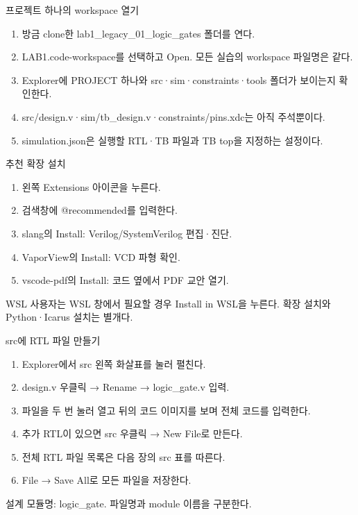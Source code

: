 \begin{frame}{프로젝트 하나의 workspace 열기}\relax
\small
\begin{enumerate}\setlength{\itemsep}{0.22cm}
\item 방금 clone한 lab1\_legacy\_01\_logic\_gates 폴더를 연다.
\item LAB1.code-workspace를 선택하고 Open. 모든 실습의 workspace 파일명은 같다.
\item Explorer에 PROJECT 하나와 src·sim·constraints·tools 폴더가 보이는지 확인한다.
\item src/design.v·sim/tb\_design.v·constraints/pins.xdc는 아직 주석뿐이다.
\item simulation.json은 실행할 RTL·TB 파일과 TB top을 지정하는 설정이다.
\end{enumerate}

\end{frame}

\begin{frame}{추천 확장 설치}\relax
\small
\begin{enumerate}\setlength{\itemsep}{0.22cm}
\item 왼쪽 Extensions 아이콘을 누른다.
\item 검색창에 @recommended를 입력한다.
\item slang의 Install: Verilog/SystemVerilog 편집·진단.
\item VaporView의 Install: VCD 파형 확인.
\item vscode-pdf의 Install: 코드 옆에서 PDF 교안 열기.
\end{enumerate}
WSL 사용자는 WSL 창에서 필요할 경우 Install in WSL을 누른다. 확장 설치와 Python·Icarus 설치는 별개다.\par
\end{frame}

\begin{frame}{src에 RTL 파일 만들기}\relax
\small
\begin{enumerate}\setlength{\itemsep}{0.22cm}
\item Explorer에서 src 왼쪽 화살표를 눌러 펼친다.
\item design.v 우클릭 → Rename → logic\_gate.v 입력.
\item 파일을 두 번 눌러 열고 뒤의 코드 이미지를 보며 전체 코드를 입력한다.
\item 추가 RTL이 있으면 src 우클릭 → New File로 만든다.
\item 전체 RTL 파일 목록은 다음 장의 src 표를 따른다.
\item File → Save All로 모든 파일을 저장한다.
\end{enumerate}
설계 모듈명: logic\_gate. 파일명과 module 이름을 구분한다.\par
\end{frame}

